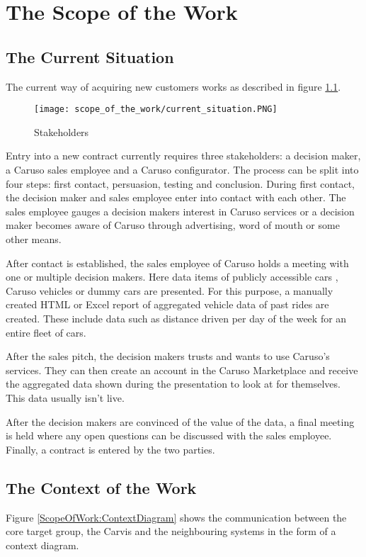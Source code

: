 \chapter{The Scope of the Work}
\section{The Current Situation}
The current way of acquiring new customers works as described in figure \ref{ScopeOfWork:Situation}.
\begin{figure}[ht]
  \centering
  \texttt{[image: scope\_of\_the\_work/current\_situation.PNG]}
  \caption{Stakeholders}
  \label{ScopeOfWork:Situation}
\end{figure}

Entry into a new contract currently requires three stakeholders: a decision maker, a Caruso sales employee and a Caruso configurator. The process can be split into four steps: first contact, persuasion, testing and conclusion. During first contact, the decision maker and sales employee enter into contact with each other. The sales employee gauges a decision makers interest in Caruso services or a decision maker becomes aware of Caruso through advertising, word of mouth or some other means.

After contact is established, the sales employee of Caruso holds a meeting with one or multiple decision makers. Here data items of publicly accessible cars , Caruso vehicles or dummy cars are presented. For this purpose, a manually created HTML or Excel report of aggregated vehicle data of past rides are created. These include data such as distance driven per day of the week for an entire fleet of cars.

After the sales pitch, the decision makers trusts and wants to use Caruso's services. They can then create an account in the Caruso Marketplace and receive the aggregated data shown during the presentation to look at for themselves. This data usually isn't live.

After the decision makers are convinced of the value of the data, a final meeting is held where any open questions can be discussed with the sales employee. Finally, a contract is entered by the two parties.

\section{The Context of the Work}
Figure \ref*{ScopeOfWork:ContextDiagram} shows the communication between the core target group, the Carvis and the neighbouring systems in the form of a context diagram.

